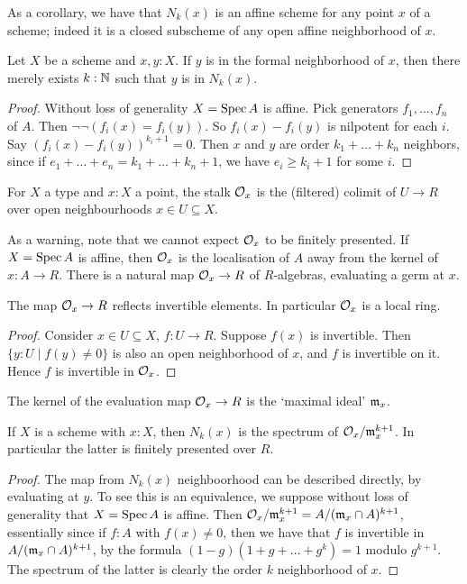 As a corollary, we have that $N_k(x)$ is an affine scheme
for any point $x$ of a scheme; 
indeed it is a closed subscheme of any open affine neighborhood of $x$.

\begin{lemma}\label{formal-nbhd-union}
Let $X$ be a scheme and $x, y : X$. If $y$ is in the formal neighborhood of $x$,
then there merely exists $k : \mathbb{N}$ such that $y$ is in $N_k(x)$.
\end{lemma}
\begin{proof}
Without loss of generality $X = \operatorname{Spec} A$ is affine. Pick generators
$f_1,\ldots,f_n$ of $A$. Then $\neg \neg(f_i(x)=f_i(y))$.
So $f_i(x)-f_i(y)$ is nilpotent for each $i$.
Say $(f_i(x)-f_i(y))^{k_i+1} = 0$.
Then $x$ and $y$ are order $k_1+\ldots+k_n$ neighbors, since
if $e_1+\ldots+e_n = k_1+\ldots+k_n+1$, we have
$e_i \ge k_i+1$ for some $i$.
\end{proof}

\begin{definition}
For $X$ a type and $x : X$ a point, the stalk $\mathcal{O}_x$ is the (filtered) 
colimit of $U \to R$ over open neighbourhoods $x \in U \subseteq X$.
\end{definition}

As a warning, note that we cannot expect $\mathcal{O}_x$ to be finitely presented.
If $X = \operatorname{Spec} A$ is affine, then $\mathcal{O}_x$ is the localisation of $A$ away from the kernel
of $x : A \to R$.
There is a natural map $\mathcal{O}_x \to R$ of $R$-algebras, evaluating a germ at $x$.

\begin{lemma}
The map $\mathcal{O}_x \to R$ reflects invertible elements. In particular $\mathcal{O}_x$ is a local ring.
\end{lemma}
\begin{proof}
Consider $x \in U \subseteq X$, $f : U \to R$. Suppose $f(x)$ is invertible.
Then $\{y : U \mid f(y) \ne 0 \}$ is also an open neighborhood of $x$,
and $f$ is invertible on it. Hence $f$ is invertible in $\mathcal{O}_x$.
\end{proof}
\begin{definition}
The kernel of the evaluation map $\mathcal{O}_x \to R$ is the `maximal ideal' $\mathfrak{m}_x$.
\end{definition}

\begin{lemma}\label{nbhd-is-spec}
If $X$ is a scheme with $x : X$, then $N_k(x)$ is the
spectrum of $\mathcal{O}_x / \mathfrak{m}_x^{k+1}$. In particular the latter is finitely presented
over $R$.
\end{lemma}
\begin{proof}
The map from $N_k(x)$ neighboorhood can be described directly, by evaluating
at $y$. To see this is an equivalence, we suppose without loss of generality that
$X = \operatorname{Spec} A$ is affine. Then $\mathcal{O}_x / \mathfrak{m}_x^{k+1} = A / (\mathfrak{m}_x \cap A)^{k+1}$,
essentially since if $f : A$ with $f(x) \ne 0$, then we have that
$f$ is invertible in $A / (\mathfrak{m}_x \cap A)^{k+1}$, by the formula
$(1 - g)(1 + g + \ldots + g^k) = 1$ modulo $g^{k+1}$.
The spectrum of the latter is clearly the order $k$ neighborhood of $x$.
\end{proof}

